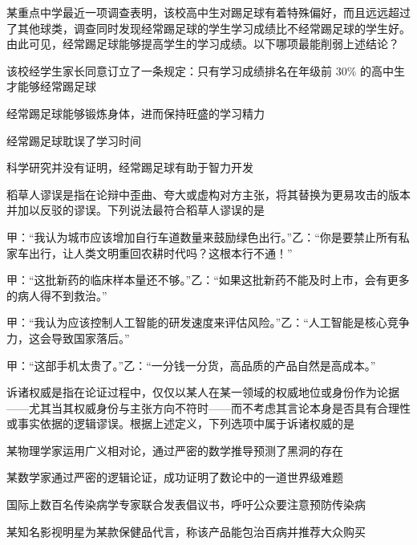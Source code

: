 \documentclass{exam-zh}
\begin{document}
\begin{question}
某重点中学最近一项调查表明，该校高中生对踢足球有着特殊偏好，而且远远超过了其他球类，调查同时发现经常踢足球的学生学习成绩比不经常踢足球的学生好。由此可见，经常踢足球能够提高学生的学习成绩。以下哪项最能削弱上述结论？\paren[]
\begin{choices}
  \item 该校经学生家长同意订立了一条规定：只有学习成绩排名在年级前 $30\%$ 的高中生才能够经常踢足球
  \item 经常踢足球能够锻炼身体，进而保持旺盛的学习精力
  \item 经常踢足球耽误了学习时间
  \item 科学研究并没有证明，经常踢足球有助于智力开发
\end{choices}
\end{question}

\begin{question}
稻草人谬误是指在论辩中歪曲、夸大或虚构对方主张，将其替换为更易攻击的版本并加以反驳的谬误。下列说法最符合稻草人谬误的是 \paren[]
\begin{choices}
  \item 甲：“我认为城市应该增加自行车道数量来鼓励绿色出行。”乙：“你是要禁止所有私家车出行，让人类文明重回农耕时代吗？这根本行不通！”
  \item 甲：“这批新药的临床样本量还不够。”乙：“如果这批新药不能及时上市，会有更多的病人得不到救治。”
  \item 甲：“我认为应该控制人工智能的研发速度来评估风险。”乙：“人工智能是核心竞争力，这会导致国家落后。”
  \item 甲：“这部手机太贵了。”乙：“一分钱一分货，高品质的产品自然是高成本。”
\end{choices}
\end{question}

\begin{question}
诉诸权威是指在论证过程中，仅仅以某人在某一领域的权威地位或身份作为论据——尤其当其权威身份与主张方向不符时——而不考虑其言论本身是否具有合理性或事实依据的逻辑谬误。根据上述定义，下列选项中属于诉诸权威的是 \paren[]
\begin{choices}
  \item 某物理学家运用广义相对论，通过严密的数学推导预测了黑洞的存在
  \item 某数学家通过严密的逻辑论证，成功证明了数论中的一道世界级难题
  \item 国际上数百名传染病学专家联合发表倡议书，呼吁公众要注意预防传染病
  \item 某知名影视明星为某款保健品代言，称该产品能包治百病并推荐大众购买
\end{choices}
\end{question}
\end{document}

